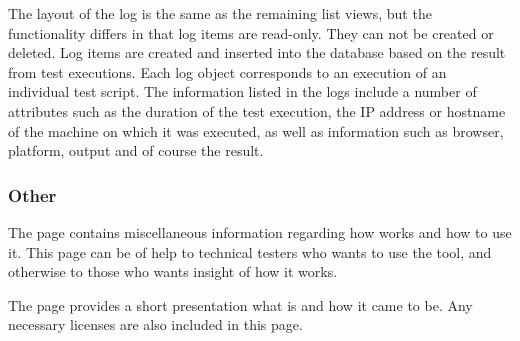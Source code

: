 
The layout of the log is the same as the remaining list views, but the functionality differs in that log items are read-only. They can not be created or deleted. Log items are created and inserted into the database based on the result from test executions. Each log object corresponds to an execution of an individual test script. The information listed in the logs include a number of attributes such as the duration of the test execution, the IP address or hostname of the machine on which it was executed, as well as information such as browser, platform, output and of course the result.







\subsubsection{Other}



\noindent The  page contains miscellaneous information regarding how \toolname \space works and how to use it. This page can be of help to technical testers who wants to use the tool, and otherwise to those who wants insight of how it works.

The  page provides a short presentation what \toolname \space is and how it came to be. Any necessary licenses are also included in this page.